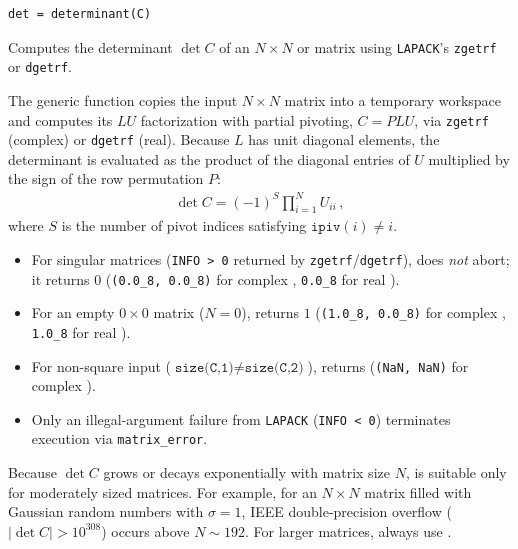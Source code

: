 
\lstset{language=[95]Fortran}
\begin{lstlisting}
det = determinant(C)
\end{lstlisting}

Computes the determinant $\det C$ of an $N\times N$  or  matrix  using \texttt{LAPACK}'s \texttt{zgetrf} or \texttt{dgetrf}.

The generic function  copies the input $N\times N$ matrix  into a temporary workspace and computes its $LU$ factorization with partial pivoting, $C = P L U$, via \texttt{zgetrf} (complex) or \texttt{dgetrf} (real). Because $L$ has unit diagonal elements, the determinant is evaluated as the product of the diagonal entries of $U$ multiplied by the sign of the row permutation $P$:
\begin{align}
  \det C = (-1)^{S} \prod_{i=1}^{N} U_{ii}\, ,
\end{align}
where $S$ is the number of pivot indices satisfying $\texttt{ipiv}(i) \neq i$.
\begin{itemize}
  \item For singular matrices (\texttt{INFO > 0} returned by \texttt{zgetrf}/\texttt{dgetrf}),  does \emph{not} abort; it returns $0$ (\texttt{(0.0\_8, 0.0\_8)} for complex , \texttt{0.0\_8} for real ).
  \item For an empty $0\times 0$ matrix ($N = 0$),  returns $1$ (\texttt{(1.0\_8, 0.0\_8)} for complex , \texttt{1.0\_8} for real ).
  \item For non-square input ($\texttt{size(C,1)} \neq \texttt{size(C,2)}$),  returns  (\texttt{(NaN, NaN)} for complex ).
  \item Only an illegal-argument failure from \texttt{LAPACK} (\texttt{INFO < 0}) terminates execution via \texttt{matrix\_error}.
\end{itemize}

\begin{warnbox}
Because $\det C$ grows or decays exponentially with matrix size $N$,  is suitable only for moderately sized matrices. For example, for an $N\times N$ matrix filled with Gaussian random numbers with $\sigma = 1$, IEEE double-precision overflow ($|\det C| > 10^{308}$) occurs above $N \sim 192$. For larger matrices, always use .
\end{warnbox}

